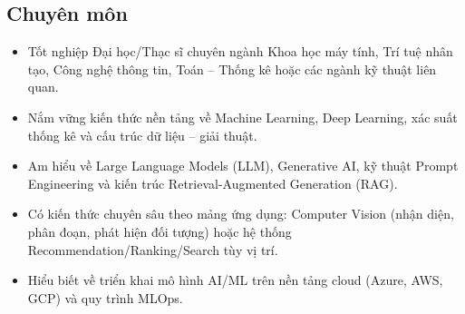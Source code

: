 \subsection{Chuyên môn}
\begin{itemize}
    \item Tốt nghiệp Đại học/Thạc sĩ chuyên ngành Khoa học máy tính, Trí tuệ nhân tạo, Công nghệ thông tin, Toán -- Thống kê hoặc các ngành kỹ thuật liên quan.
    \item Nắm vững kiến thức nền tảng về Machine Learning, Deep Learning, xác suất thống kê và cấu trúc dữ liệu -- giải thuật.
    \item Am hiểu về Large Language Models (LLM), Generative AI, kỹ thuật Prompt Engineering và kiến trúc Retrieval-Augmented Generation (RAG).
    \item Có kiến thức chuyên sâu theo mảng ứng dụng: Computer Vision (nhận diện, phân đoạn, phát hiện đối tượng) hoặc hệ thống Recommendation/Ranking/Search tùy vị trí.
    \item Hiểu biết về triển khai mô hình AI/ML trên nền tảng cloud (Azure, AWS, GCP) và quy trình MLOps.
\end{itemize}
